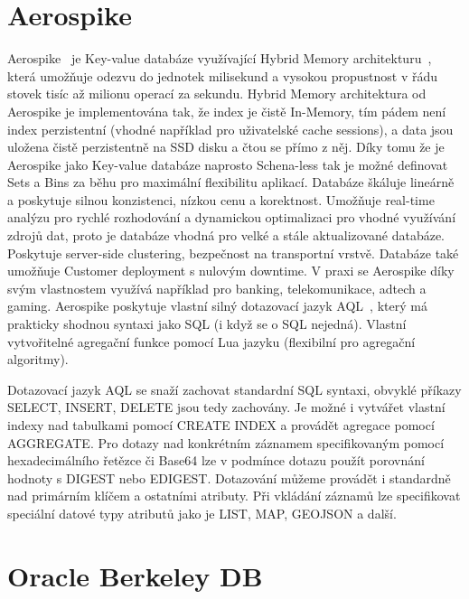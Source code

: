 \documentclass[czech,master,dept460,male,csharp,cpdeclaration]{diploma}
\begin{document}
	\section{Aerospike}
	
	Aerospike~\cite{aerospike} je Key-value databáze využívající Hybrid Memory architekturu~\cite{hybmem-arch}, která umožňuje odezvu do jednotek milisekund a vysokou propustnost v řádu stovek tisíc až milionu operací za sekundu. Hybrid Memory architektura od Aerospike je implementována tak, že index je čistě In-Memory, tím pádem není index perzistentní (vhodné například pro uživatelské cache sessions), a data jsou uložena čistě perzistentně na SSD disku a čtou se přímo z něj. Díky tomu že je Aerospike jako Key-value databáze naprosto Schena-less tak je možné definovat Sets a Bins za běhu pro maximální flexibilitu aplikací. Databáze škáluje lineárně a poskytuje silnou konzistenci, nízkou cenu a korektnost. Umožňuje real-time analýzu pro rychlé rozhodování a dynamickou optimalizaci pro vhodné využívání zdrojů dat, proto je databáze vhodná pro velké a stále aktualizované databáze. Poskytuje server-side clustering, bezpečnost na transportní vrstvě. Databáze také umožňuje Customer deployment s nulovým downtime. V praxi se Aerospike díky svým vlastnostem využívá například pro banking, telekomunikace, adtech a gaming. Aerospike poskytuje vlastní silný dotazovací jazyk AQL~\cite{aql}, který má prakticky shodnou syntaxi jako SQL (i když se o SQL nejedná). Vlastní vytvořitelné agregační funkce pomocí Lua jazyku (flexibilní pro agregační algoritmy).
	
	Dotazovací jazyk AQL se snaží zachovat standardní SQL syntaxi, obvyklé příkazy SELECT, INSERT, DELETE jsou tedy zachovány. Je možné i vytvářet vlastní indexy nad tabulkami pomocí CREATE INDEX a provádět agregace pomocí AGGREGATE. Pro dotazy nad konkrétním záznamem specifikovaným pomocí hexadecimálního řetězce či Base64 lze v podmínce dotazu použít porovnání hodnoty s DIGEST nebo EDIGEST. Dotazování můžeme provádět i standardně nad primárním klíčem a ostatními atributy. Při vkládání záznamů lze specifikovat speciální datové typy atributů jako je LIST, MAP, GEOJSON a další.
	
	\section{Oracle Berkeley DB}
	
\end{document}
